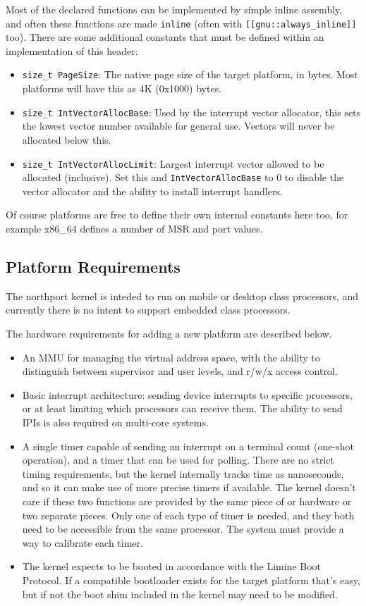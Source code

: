 Most of the declared functions can be implemented by simple inline assembly, and often these functions are made \verb|inline| (often with \verb|[[gnu::always_inline]]| too). There are some additional constants that must be defined within an implementation of this header:

\begin{itemize}
    \item \verb|size_t PageSize|: The native page size of the target platform, in bytes. Most platforms will have this as 4K (0x1000) bytes.
    \item \verb|size_t IntVectorAllocBase|: Used by the interrupt vector allocator, this sets the lowest vector number available for general use. Vectors will never be allocated below this.
    \item \verb|size_t IntVectorAllocLimit|: Largest interrupt vector allowed to be allocated (inclusive). Set this and \verb|IntVectorAllocBase| to 0 to disable the vector allocator and the ability to install interrupt handlers.
\end{itemize}

Of course platforms are free to define their own internal constants here too, for example x86\_64 defines a number of MSR and port values.

\subsection{Platform Requirements}
The northport kernel is inteded to run on mobile or desktop class processors, and currently there is no intent to support embedded class processors.

The hardware requirements for adding a new platform are described below.

\begin{itemize}
    \item An MMU for managing the virtual address space, with the ability to distinguish between supervisor and user levels, and r/w/x access control.
    \item Basic interrupt architecture: sending device interrupts to specific processors, or at least limiting which processors can receive them. The ability to send IPIs is also required on multi-core systems.
    \item A single timer capable of sending an interrupt on a terminal count (one-shot operation), and a timer that can be used for polling. There are no strict timing requirements, but the kernel internally tracks time as nanoseconds, and so it can make use of more precise timers if available. The kernel doesn't care if these two functions are provided by the same piece of or hardware or two separate pieces. Only one of each type of timer is needed, and they both need to be accessible from the same processor. The system must provide a way to calibrate each timer.
    \item The kernel expects to be booted in accordance with the Limine Boot Protocol. If a compatible bootloader exists for the target platform that's easy, but if not the boot shim included in the kernel may need to be modified.
\end{itemize}

